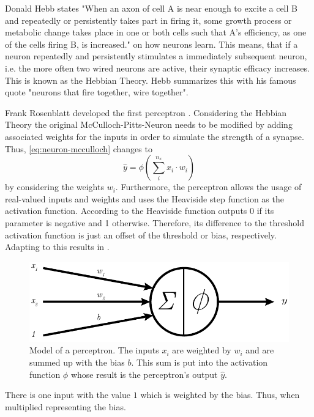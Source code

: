 Donald Hebb states "When an axon of cell A is near enough to excite a cell B and repeatedly or persistently takes part in firing it, some growth process or metabolic change takes place in one or both cells such that A's efficiency, as one of the cells firing B, is increased." \cite{Hebb1949} on how neurons learn.
This means, that if a neuron repeatedly and persistently stimulates a immediately subsequent neuron, i.e. the more often two wired neurons are active, their synaptic efficacy increases.
This is known as the Hebbian Theory.
Hebb summarizes this with his famous quote "neurons that fire together, wire together".

Frank Rosenblatt developed the first perceptron \cite{Rosenblatt58}.
Considering the Hebbian Theory the original McCulloch-Pitts-Neuron needs to be modified by adding associated weights for the inputs in order to simulate the strength of a synapse.
Thus, \eqref{eq:neuron-mcculloch} changes to
\begin{equation}
	\label{eq:neuron}
	\hat{y} = \phi \left( \sum_{i}^{n_x} x_i \cdot w_i \right)
\end{equation}
by considering the weights $w_i$.
Furthermore, the perceptron allows the usage of real-valued inputs and weights and uses the Heaviside step function as the activation function.
According to  the Heaviside function outputs 0 if its parameter is negative and 1 otherwise.
Therefore, its difference to the threshold activation function is just an offset of the threshold or bias, respectively.
Adapting  to this results in .
\begin{figure}
	\centering
	\includegraphics{images/perceptron}
	\caption[Model of a perceptron]{Model of a perceptron. The inputs $x_i$ are weighted by $w_i$ and are summed up with the bias $b$. This sum is put into the activation function $\phi$ whose result is the perceptron's output $\hat{y}$.}
	\label{fig:perceptron}
\end{figure}
There is one input with the value $1$ which is weighted by the bias.
Thus, when multiplied representing the bias.
